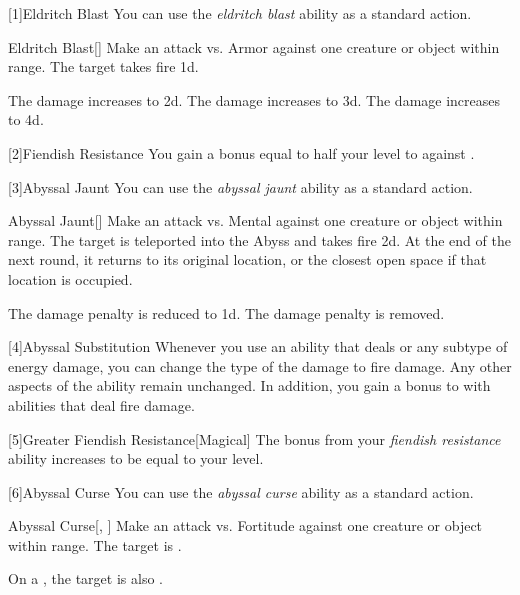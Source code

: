         [1]{Eldritch Blast} You can use the \textit{eldritch blast} ability as a standard action.
        \begin{freeability}{Eldritch Blast}[]
            Make an attack vs. Armor against one creature or object within \rngclose range.
            \hit The target takes fire  \plus1d.

            \rankline
             The damage increases to  \plus2d.
             The damage increases to  \plus3d.
             The damage increases to  \plus4d.
        \end{freeability}

        [2]{Fiendish Resistance} You gain a bonus equal to half your level to  against .

        [3]{Abyssal Jaunt} You can use the \textit{abyssal jaunt} ability as a standard action.
        \begin{freeability}{Abyssal Jaunt}[]
            Make an attack vs. Mental against one creature or object within \rngclose range.
            \hit The target is teleported into the Abyss and takes fire  \minus2d.
            At the end of the next round, it returns to its original location, or the closest open space if that location is occupied.

            \rankline
             The damage penalty is reduced to \minus1d.
             The damage penalty is removed.
        \end{freeability}

        [4]{Abyssal Substitution} Whenever you use an ability that deals  or any subtype of energy damage, you can change the type of the damage to fire damage.
        Any other aspects of the ability remain unchanged.
        In addition, you gain a  bonus to  with abilities that deal fire damage.

        [5]{Greater Fiendish Resistance}[Magical] The bonus from your \textit{fiendish resistance} ability increases to be equal to your level.

        [6]{Abyssal Curse} You can use the \textit{abyssal curse} ability as a standard action.
        \begin{freeability}{Abyssal Curse}[, ]
            Make an attack vs. Fortitude against one creature or object within \rngclose range.
            \hit The target is .

            \rankline
             On a , the target is also .
        \end{freeability}

